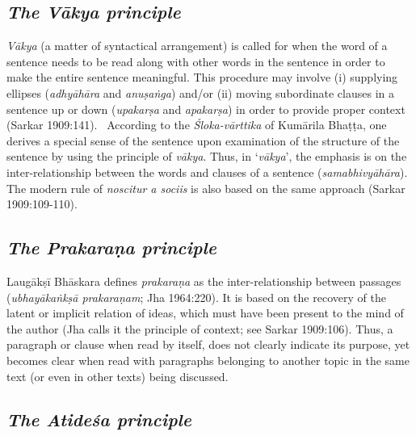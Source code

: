 \subsection*{\textit{The Vākya principle}}

\textit{Vākya} (a matter of syntactical arrangement) is called for when the word of a sentence needs to be read along with other words in the sentence in order to make the entire sentence meaningful. This procedure may involve (i) supplying ellipses (\textit{adhyāhāra} and \textit{anuṣaṅga}) and/or (ii) moving subordinate clauses in a sentence up or down (\textit{upakarṣa} and \textit{apakarṣa}) in order to provide proper context (Sarkar 1909:141).  According to the \textit{Śloka-vārttika} of Kumārila Bhaṭṭa, one derives a special sense of the sentence upon examination of the structure of the sentence by using the principle of \textit{vākya}. Thus, in ‘\textit{vākya}’, the emphasis is on the inter-relationship between the words and clauses of a sentence (\textit{samabhivyāhāra}). The modern rule of \textit{noscitur a sociis} is also based on the same approach (Sarkar 1909:109-110).


\subsection*{\textit{The Prakaraṇa principle}}

Laugākṣī Bhāskara defines \textit{prakaraṇa} as the inter-relationship between passages (\textit{ubhayākaṅkṣā prakaraṇam}; Jha 1964:220). It is based on the recovery of the latent or implicit relation of ideas, which must have been present to the mind of the author (Jha calls it the principle of context; see Sarkar 1909:106). Thus, a paragraph or clause when read by itself, does not clearly indicate its purpose, yet becomes clear when read with paragraphs belonging to another topic in the same text (or even in other texts) being discussed.


\subsection*{\textit{The Atideśa principle}}

